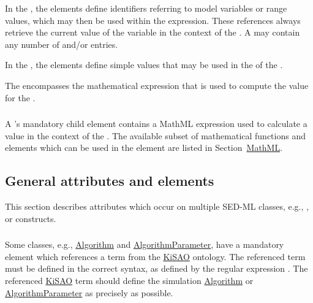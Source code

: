 \begin{blockChanged}

In the \ListOfVariables, the \Variable elements define identifiers referring to model variables or range values, which may then be used within the \Math expression. These references always retrieve the current value of the variable in the context of the \Calculation.  A \ListOfVariables may contain any number of \Variable and/or \DependentVariable entries.

In the \ListOfParameters, the \Parameter elements define simple values that may be used in the \Math of the \Calculation.

The \Math encompasses the mathematical expression that is used to compute the value for the \Calculation.

\subsubsection{}
\label{sec:math}
A \Calculation's mandatory child element  contains a MathML expression used to calculate a value in the context of the \Calculation.  The available subset of mathematical functions and elements which can be used in the \Math element are listed in Section~\hyperref[sec:mathML]{MathML}.


\subsection{General attributes and elements}
This section describes attributes which occur on multiple SED-ML classes, e.g., \kisaoID, or \hyperref[class:listOf]{} constructs.
\label{sec:generalAttributes}

\end{blockChanged}
\subsubsection{}
\label{sec:kisaoid}
Some classes, e.g., \hyperref[class:algorithm]{Algorithm} and \hyperref[class:algorithmParameter]{AlgorithmParameter}, have a mandatory element   which references a term from the \hyperref[sec:kisao]{KiSAO} ontology. The referenced term must be defined in the correct syntax, as defined by the regular expression . The referenced \hyperref[sec:kisao]{KiSAO} term  should define the simulation \hyperref[class:algorithm]{Algorithm} or \hyperref[class:algorithmParameter]{AlgorithmParameter} as precisely as possible.  


